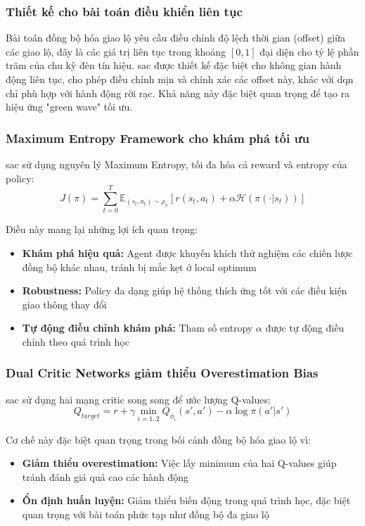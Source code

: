 \subsubsection{Thiết kế cho bài toán điều khiển liên tục}
Bài toán đồng bộ hóa giao lộ yêu cầu điều chỉnh độ lệch thời gian (offset) giữa các giao lộ, đây là các giá trị liên tục trong khoảng $[0, 1]$ đại diện cho tỷ lệ phần trăm của chu kỳ đèn tín hiệu. \ac{sac} được thiết kế đặc biệt cho không gian hành động liên tục, cho phép điều chỉnh mịn và chính xác các offset này, khác với \ac{dqn} chỉ phù hợp với hành động rời rạc. Khả năng này đặc biệt quan trọng để tạo ra hiệu ứng "green wave" tối ưu.

\subsubsection{Maximum Entropy Framework cho khám phá tối ưu}
\ac{sac} sử dụng nguyên lý Maximum Entropy, tối đa hóa cả reward và entropy của policy:
\begin{equation}
    J(\pi) = \sum_{t=0}^{T} \mathbb{E}_{(s_t,a_t) \sim \rho_\pi} [r(s_t, a_t) + \alpha \mathcal{H}(\pi(\cdot|s_t))]
\end{equation}

Điều này mang lại những lợi ích quan trọng:
\begin{itemize}
    \item \textbf{Khám phá hiệu quả:} Agent được khuyến khích thử nghiệm các chiến lược đồng bộ khác nhau, tránh bị mắc kẹt ở local optimum
    \item \textbf{Robustness:} Policy đa dạng giúp hệ thống thích ứng tốt với các điều kiện giao thông thay đổi
    \item \textbf{Tự động điều chỉnh khám phá:} Tham số entropy $\alpha$ được tự động điều chỉnh theo quá trình học
\end{itemize}

\subsubsection{Dual Critic Networks giảm thiểu Overestimation Bias}
\ac{sac} sử dụng hai mạng critic song song để ước lượng Q-values:
\begin{equation}
    Q_{target} = r + \gamma \min_{i=1,2} Q_{\phi_i}(s', a') - \alpha \log \pi(a'|s')
\end{equation}

Cơ chế này đặc biệt quan trọng trong bối cảnh đồng bộ hóa giao lộ vì:
\begin{itemize}
    \item \textbf{Giảm thiểu overestimation:} Việc lấy minimum của hai Q-values giúp tránh đánh giá quá cao các hành động
    \item \textbf{Ổn định huấn luyện:} Giảm thiểu biến động trong quá trình học, đặc biệt quan trọng với bài toán phức tạp như đồng bộ đa giao lộ
\end{itemize}

